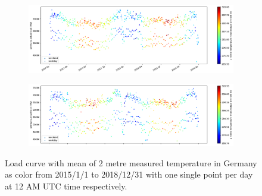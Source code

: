 
\begin{figure}[H]%
	\centering
	\begin{subfigure}{.5\textwidth}
		\centering
		\includegraphics[width=2.9\textwidth,angle=-90,origin=c]{plots/plot_load_time_func/t2m_mean_18A5_2017010112_2018123112_24F}%
		\label{fig:t2m_mean_18A5_2017010112_2018123112_24F}%
	\end{subfigure}%
	\begin{subfigure}{.5\textwidth}
		\centering
		\includegraphics[width=2.9\textwidth,angle=-90,origin=c]{plots/plot_load_time_func/t2m_mean_18A5_2015010112_2016123112_24F}%
		\label{fig:t2m_mean_18A5_2015010112_2016123112_24F}%
	\end{subfigure}
	\caption{Load curve with mean of 2 metre measured temperature in Germany as color from 2015/1/1 to 2018/12/31 with one single point per day at 12 AM UTC time respectively.}
	\label{fig:t2m_mean_18A5_twofold_24F}
\end{figure}





